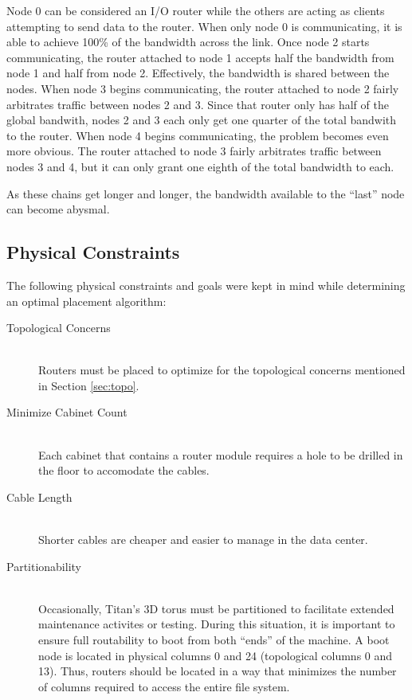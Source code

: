 Node 0 can be considered an I/O router while the others are acting as clients
attempting to send data to the router.  When only node 0 is communicating, it
is able to achieve 100\% of the bandwidth across the link.  Once node 2 starts
communicating, the router attached to node 1 accepts half the bandwidth from
node 1 and half from node 2.  Effectively, the bandwidth is shared between the
nodes.  When node 3 begins communicating, the router attached to node 2 fairly
arbitrates traffic between nodes 2 and 3.  Since that router only has half of
the global bandwith, nodes 2 and 3 each only get one quarter of the total
bandwith to the router.  When node 4 begins communicating, the problem becomes
even more obvious.  The router attached to node 3 fairly arbitrates traffic
between nodes 3 and 4, but it can only grant one eighth of the total bandwidth
to each.

As these chains get longer and longer, the bandwidth available to the ``last''
node can become abysmal.

\subsection{Physical Constraints}


The following physical constraints and goals were kept in mind while
determining an optimal placement algorithm:

\begin{description}
  \item[Topological Concerns] \hfill \\
    Routers must be placed to optimize for the topological concerns mentioned
    in Section \ref{sec:topo}.
  \item[Minimize Cabinet Count] \hfill \\
    Each cabinet that contains a router module requires a hole to be drilled in
    the floor to accomodate the cables.
  \item[Cable Length] \hfill \\
    Shorter cables are cheaper and easier to manage in the data center.
  \item[Partitionability] \hfill \\
    Occasionally, Titan's 3D torus must be partitioned to facilitate extended
    maintenance activites or testing.  During this situation, it is important to
    ensure full routability to boot from both ``ends'' of the machine.  A boot
    node is located in physical columns 0 and 24 (topological columns 0 and 13).
    Thus, routers should be located in a way that minimizes the number of
    columns required to access the entire file system.
\end{description}

